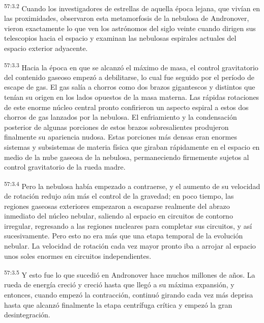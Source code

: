 \par
\textsuperscript{57:3.2} Cuando los investigadores de estrellas de aquella época lejana, que vivían en las proximidades, observaron esta metamorfosis de la nebulosa de Andronover, vieron exactamente lo que ven los astrónomos del siglo veinte cuando dirigen sus telescopios hacia el espacio y examinan las nebulosas espirales actuales del espacio exterior adyacente.

\par
\textsuperscript{57:3.3} Hacia la época en que se alcanzó el máximo de masa, el control gravitatorio del contenido gaseoso empezó a debilitarse, lo cual fue seguido por el período de escape de gas. El gas salía a chorros como dos brazos gigantescos y distintos que tenían su origen en los lados opuestos de la masa materna. Las rápidas rotaciones de este enorme núcleo central pronto confirieron un aspecto espiral a estos dos chorros de gas lanzados por la nebulosa. El enfriamiento y la condensación posterior de algunas porciones de estos brazos sobresalientes produjeron finalmente su apariencia nudosa. Estas porciones más densas eran enormes sistemas y subsistemas de materia física que giraban rápidamente en el espacio en medio de la nube gaseosa de la nebulosa, permaneciendo firmemente sujetos al control gravitatorio de la rueda madre.

\par
\textsuperscript{57:3.4} Pero la nebulosa había empezado a contraerse, y el aumento de su velocidad de rotación redujo aún más el control de la gravedad; en poco tiempo, las regiones gaseosas exteriores empezaron a escaparse realmente del abrazo inmediato del núcleo nebular, saliendo al espacio en circuitos de contorno irregular, regresando a las regiones nucleares para completar sus circuitos, y así sucesivamente. Pero esto no era más que una etapa temporal de la evolución nebular. La velocidad de rotación cada vez mayor pronto iba a arrojar al espacio unos soles enormes en circuitos independientes.

\par
\textsuperscript{57:3.5} Y esto fue lo que sucedió en Andronover hace muchos millones de años. La rueda de energía creció y creció hasta que llegó a su máxima expansión, y entonces, cuando empezó la contracción, continuó girando cada vez más deprisa hasta que alcanzó finalmente la etapa centrífuga crítica y empezó la gran desintegración.

